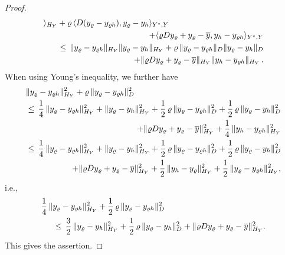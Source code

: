 \documentclass{article}
\numberwithin{equation}{section}
\begin{document}
\begin{proof}
\begin{eqnarray*}
       \rangle_{H_Y} + \varrho \, \langle D (y_\varrho - y_{\varrho h}),
       y_\varrho - y_h \rangle_{Y^*,Y} \\
    && \hspace*{-3cm}
       + \langle \varrho D y_\varrho + y_\varrho - \overline{y} ,
       y_h - y_{\varrho h} \rangle_{Y^*,Y} \\
    && \hspace*{-5cm}
       \leq \, \| y_\varrho - y_{\varrho h} \|_{H_Y}
       \| y_\varrho - y_h \|_{H_Y} + \varrho \,
       \| y_\varrho - y_{\varrho h} \|_D \| y_\varrho - y_h \|_D \\
    && \hspace*{-3cm} +
       \| \varrho D y_\varrho + y_\varrho - \overline{y} \|_{H_Y}
       \| y_h - y_{\varrho h} \|_{H_Y} \, .
  \end{eqnarray*}
  When using Young's inequality, we further have
    \begin{eqnarray*}
    \| y_\varrho - y_{\varrho h} \|^2_{H_Y} +
    \varrho \, \| y_\varrho - y_{\varrho h} \|^2_D
      && \\
       && \hspace*{-5cm}
       \leq \, \frac{1}{4} \, \| y_\varrho - y_{\varrho h} \|_{H_Y}^2 +
       \| y_\varrho - y_h \|_{H_Y}^2 + \frac{1}{2} \, \varrho \,
          \| y_\varrho - y_{\varrho h} \|_D^2 +
          \frac{1}{2} \, \varrho \, \| y_\varrho - y_h \|^2_D \\
    && \hspace*{-3cm} +
       \| \varrho D y_\varrho + y_\varrho - \overline{y} \|_{H_Y}^2 +
       \frac{1}{4} \, \| y_h - y_{\varrho h} \|_{H_Y}^2 \\
       && \hspace*{-5cm}
       \leq \, \frac{1}{4} \, \| y_\varrho - y_{\varrho h} \|_{H_Y}^2 +
       \| y_\varrho - y_h \|_{H_Y}^2 + \frac{1}{2} \, \varrho \,
          \| y_\varrho - y_{\varrho h} \|_D^2 +
          \frac{1}{2} \, \varrho \, \| y_\varrho - y_h \|^2_D \\
    && \hspace*{-3cm} +
       \| \varrho D y_\varrho + y_\varrho - \overline{y} \|_{H_Y}^2 +
       \frac{1}{2} \, \| y_h - y_\varrho \|_{H_Y}^2 +
       \frac{1}{2} \, \| y_\varrho - y_{\varrho h} \|_{H_Y}^2 ,
    \end{eqnarray*}
    i.e.,
       \begin{eqnarray*}
    \frac{1}{4} \, \| y_\varrho - y_{\varrho h} \|^2_{H_Y} +
    \frac{1}{2} \, \varrho \, \| y_\varrho - y_{\varrho h} \|^2_D
      && \\
       && \hspace*{-5cm}
       \leq \, 
       \frac{3}{2} \, \| y_\varrho - y_h \|_{H_Y}^2 +
          \frac{1}{2} \, \varrho \, \| y_\varrho - y_h \|^2_D +
       \| \varrho D y_\varrho + y_\varrho - \overline{y} \|_{H_Y}^2 .
       \end{eqnarray*}
       This gives the assertion.
\end{proof}
\end{document}
